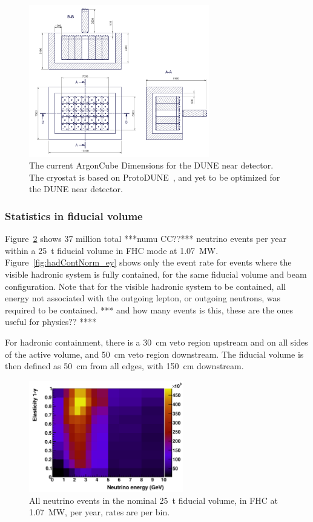 \begin{figure}[tbp]
	\centering
	\includegraphics[width=0.7\textwidth]{graphics/actual-size.png}
	\caption{The current ArgonCube Dimensions for the DUNE near detector. The cryostat is based on ProtoDUNE~\cite{Abi:2017aow}, and yet to be optimized for the DUNE near detector.}
	\label{fig:actual-size}
\end{figure}


\subsubsection{Statistics in fiducial volume}\label{sec:rates}

Figure~\ref{fig:all_ey} shows 37 million total ***numu CC??*** neutrino events per year within a \SI{25}{\tonne} fiducial volume in FHC mode at \SI{1.07}{\mega\watt}. Figure~\ref{fig:hadContNorm_ey} shows only the event rate for events where the visible hadronic system is fully contained, for the same fiducial volume and beam configuration. Note that for the visible hadronic system to be contained, all energy not associated with the outgoing lepton, or outgoing neutrons, was required to be contained. *** and how many events is this, these are the ones useful for physics?? ****

For hadronic containment, there is a \SI{30}{\centi\metre} veto region upstream and on all sides of the active volume, and \SI{50}{\centi\metre} veto region downstream. The fiducial volume is then defined as \SI{50}{\centi\metre} from all edges, with \SI{150}{\centi\metre} downstream.   

\begin{figure}[tbp]
	\centering
	\includegraphics[width=0.6\textwidth]{graphics/all_ey.png}
	\caption{All neutrino events in the nominal \SI{25}{\tonne} fiducial volume, in FHC at \SI{1.07}{\mega\watt}, per year, rates are per bin.}
	\label{fig:all_ey}
\end{figure}

